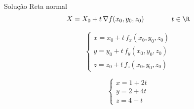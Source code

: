 \begin{resolution}{Solução}
  Reta normal
  \pause
  \[
    X = X_0 + t\,\nabla f(x_0, y_0, z_0)
    \qquad\qquad
    t \in \R
  \]

  \pause
  \[
    \begin{cases}
      x = x_0 + t\,f_x(x_0, y_0, z_0) \\
      y = y_0 + t\,f_y(x_0, y_0, z_0) \\
      z = z_0 + t\,f_z(x_0, y_0, z_0)
    \end{cases}
  \]

  \pause
  \[
    \begin{cases}
      x = 1 + 2t \\
      y = 2 + 4t \\
      z = 4 + t
    \end{cases}
  \]
\end{resolution}

